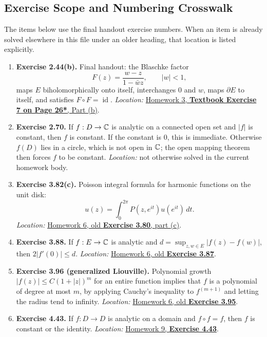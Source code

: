 \documentclass{article}
\begin{document}
\subsection{Exercise Scope and Numbering Crosswalk}

The items below use the final handout exercise numbers.  When an item is
already solved elsewhere in this file under an older heading, that location is
listed explicitly.

\begin{enumerate}
  \item \textbf{Exercise 2.44(b).}
  Final handout: the Blaschke factor
  \[
    F(z)=\frac{w-z}{1-\bar w z},\qquad |w|<1,
  \]
  maps $E$ biholomorphically onto itself, interchanges $0$ and $w$, maps
  $\partial E$ to itself, and satisfies $F\circ F=\operatorname{id}$.
  \textit{Location:}
  \hyperref[sec:ca-ex-2-44b]{Homework 3, \textbf{Textbook Exercise 7 on Page 26*},
  Part (b)}.

  \item \textbf{Exercise 2.70.}
  If $f:D\to\mathbb{C}$ is analytic on a connected open set and $|f|$ is constant,
  then $f$ is constant.  If the constant is $0$, this is immediate.  Otherwise
  $f(D)$ lies in a circle, which is not open in $\mathbb{C}$; the open mapping theorem
  then forces $f$ to be constant.
  \textit{Location:} not otherwise solved in the current homework body.

  \item \textbf{Exercise 3.82(c).}
  Poisson integral formula for harmonic functions on the unit disk:
  \[
    u(z)=\int_0^{2\pi}P(z,e^{it})u(e^{it})\,dt.
  \]
  \textit{Location:}
  \hyperref[sec:ca-ex-3-80]{Homework 6, old \textbf{Exercise 3.80}, part (c)}.

  \item \textbf{Exercise 3.88.}
  If $f:E\to\mathbb{C}$ is analytic and
  $d=\sup_{z,w\in E}|f(z)-f(w)|$, then $2|f'(0)|\le d$.
  \textit{Location:}
  \hyperref[sec:ca-ex-3-87]{Homework 6, old \textbf{Exercise 3.87}}.

  \item \textbf{Exercise 3.96 (generalized Liouville).}
  Polynomial growth $|f(z)|\le C(1+|z|)^m$ for an entire function implies that
  $f$ is a polynomial of degree at most $m$, by applying Cauchy's inequality to
  $f^{(m+1)}$ and letting the radius tend to infinity.
  \textit{Location:}
  \hyperref[sec:ca-ex-3-95]{Homework 6, old \textbf{Exercise 3.95}}.

  \item \textbf{Exercise 4.43.}
  If $f:D\to D$ is analytic on a domain and $f\circ f=f$, then $f$ is constant
  or the identity.  \textit{Location:}
  \hyperref[sec:ca-ex-4-43]{Homework 9, \textbf{Exercise 4.43}}.


\end{enumerate}
\end{document}
